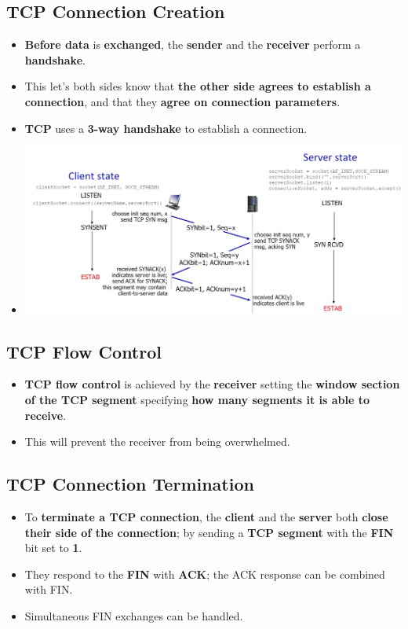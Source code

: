 \documentclass[16pt]{article}
\begin{document}
    \subsection*{TCP Connection Creation}
    \begin{itemize}
        \item \textbf{Before data} is \textbf{exchanged}, the \textbf{sender} and the \textbf{receiver} perform a \textbf{handshake}.
        \item This let's both sides know that \textbf{the other side agrees to establish a connection}, and that they \textbf{agree on connection parameters}.
        \item \textbf{TCP} uses a \textbf{3-way handshake} to establish a connection.
        \item[] \includegraphics*[width=\textwidth - 25pt]{images/TCPHandShake.PNG}
    \end{itemize}

    \subsection*{TCP Flow Control}
    \begin{itemize}
        \item \textbf{TCP flow control} is achieved by the \textbf{receiver} setting the \textbf{window section of the TCP segment} specifying \textbf{how many segments it is able to receive}.
        \item This will prevent the receiver from being overwhelmed.
    \end{itemize}

    \subsection*{TCP Connection Termination}
    \begin{itemize}
        \item To \textbf{terminate a TCP connection}, the \textbf{client} and the \textbf{server} both \textbf{close their side of the connection}; by sending a \textbf{TCP segment} with the \textbf{FIN} bit set to \textbf{1}.
        \item They respond to the \textbf{FIN} with \textbf{ACK}; the ACK response can be combined with FIN.
        \item Simultaneous FIN exchanges can be handled.
    \end{itemize}
\end{document}
